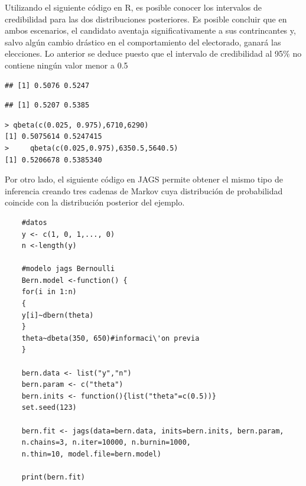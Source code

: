 \begin{Eje}
    Utilizando el siguiente c\'odigo en R, es posible conocer los intervalos de credibilidad para las dos distribuciones posteriores. Es posible concluir que en ambos escenarios, el candidato aventaja significativamente a sus contrincantes y, salvo alg\'un cambio dr\'astico en el comportamiento del electorado, ganar\'a las elecciones. Lo anterior se deduce puesto que el intervalo de credibilidad al 95\% no contiene ning\'un valor menor a 0.5
    
\begin{knitrout}
\color{fgcolor}\begin{kframe}
\begin{alltt}
\hlstd{(}\hlstd{(}\hlstd{,} \hlstd{),}\hlstd{,}\hlstd{)}
\end{alltt}
\begin{verbatim}
## [1] 0.5076 0.5247
\end{verbatim}
\begin{alltt}
\hlstd{(}\hlstd{(}\hlstd{,}\hlstd{),}\hlstd{,}\hlstd{)}
\end{alltt}
\begin{verbatim}
## [1] 0.5207 0.5385
\end{verbatim}
\end{kframe}
\end{knitrout}
    
\begin{verbatim}
> qbeta(c(0.025, 0.975),6710,6290)
[1] 0.5075614 0.5247415
>     qbeta(c(0.025,0.975),6350.5,5640.5)
[1] 0.5206678 0.5385340
\end{verbatim}
    Por otro lado, el siguiente c\'odigo en JAGS permite obtener el mismo tipo de inferencia creando tres cadenas de Markov cuya distribuci\'on de probabilidad coincide con la distribuci\'on posterior del ejemplo.
    
    \begin{mdframed}
    \begin{verbatim}
    #datos
    y <- c(1, 0, 1,..., 0)
    n <-length(y)
    
    #modelo jags Bernoulli
    Bern.model <-function() {
    for(i in 1:n)
    {
    y[i]~dbern(theta)
    }
    theta~dbeta(350, 650)#informaci\'on previa 
    }
    
    bern.data <- list("y","n")
    bern.param <- c("theta")
    bern.inits <- function(){list("theta"=c(0.5))}
    set.seed(123)
    
    bern.fit <- jags(data=bern.data, inits=bern.inits, bern.param, 
    n.chains=3, n.iter=10000, n.burnin=1000,
    n.thin=10, model.file=bern.model)
    
    print(bern.fit)
    \end{verbatim}
    \end{mdframed}
    \end{Eje}
    
